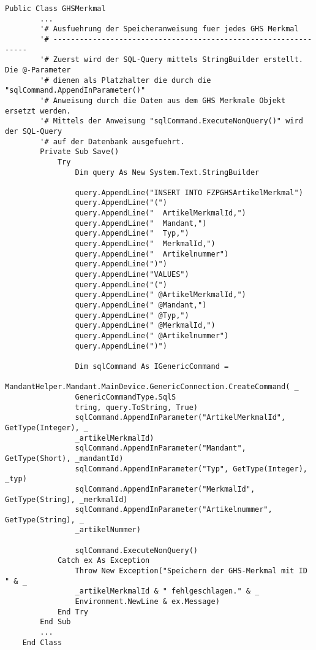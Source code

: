 \begin{lstlisting}[style=A, caption=Auszug Speicherroutine GHS/CLP Merkmale (.NET),
label={code:speichern}]
    Public Class GHSMerkmal
        ...
        '# Ausfuehrung der Speicheranweisung fuer jedes GHS Merkmal
        '# ----------------------------------------------------------------
        '# Zuerst wird der SQL-Query mittels StringBuilder erstellt. Die @-Parameter 
        '# dienen als Platzhalter die durch die "sqlCommand.AppendInParameter()" 
        '# Anweisung durch die Daten aus dem GHS Merkmale Objekt ersetzt werden. 
        '# Mittels der Anweisung "sqlCommand.ExecuteNonQuery()" wird der SQL-Query 
        '# auf der Datenbank ausgefuehrt.
        Private Sub Save()
            Try
                Dim query As New System.Text.StringBuilder
                
                query.AppendLine("INSERT INTO FZPGHSArtikelMerkmal")
                query.AppendLine("(")
                query.AppendLine("  ArtikelMerkmalId,")
                query.AppendLine("  Mandant,")
                query.AppendLine("  Typ,")
                query.AppendLine("  MerkmalId,")
                query.AppendLine("  Artikelnummer")
                query.AppendLine(")")
                query.AppendLine("VALUES")
                query.AppendLine("(")
                query.AppendLine(" @ArtikelMerkmalId,")
                query.AppendLine(" @Mandant,")
                query.AppendLine(" @Typ,")
                query.AppendLine(" @MerkmalId,")
                query.AppendLine(" @Artikelnummer")
                query.AppendLine(")")
                
                Dim sqlCommand As IGenericCommand = 
                MandantHelper.Mandant.MainDevice.GenericConnection.CreateCommand( _
                GenericCommandType.SqlS
                tring, query.ToString, True)
                sqlCommand.AppendInParameter("ArtikelMerkmalId", GetType(Integer), _
                _artikelMerkmalId)
                sqlCommand.AppendInParameter("Mandant", GetType(Short), _mandantId)
                sqlCommand.AppendInParameter("Typ", GetType(Integer), _typ)
                sqlCommand.AppendInParameter("MerkmalId", GetType(String), _merkmalId)
                sqlCommand.AppendInParameter("Artikelnummer", GetType(String), _
                _artikelNummer)
    
                sqlCommand.ExecuteNonQuery()
            Catch ex As Exception
                Throw New Exception("Speichern der GHS-Merkmal mit ID " & _
                _artikelMerkmalId & " fehlgeschlagen." & _
                Environment.NewLine & ex.Message)
            End Try
        End Sub
        ...
    End Class
\end{lstlisting}

